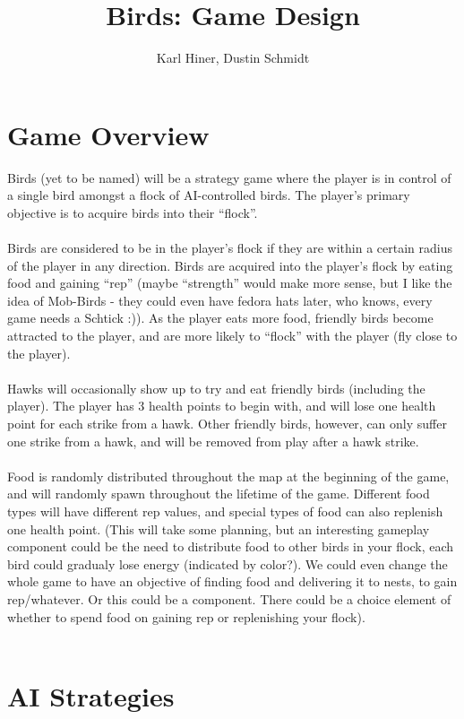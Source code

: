 \documentclass{article}
\begin{document}
\title{Birds: Game Design}
\author{Karl Hiner, Dustin Schmidt}
\maketitle

\section*{Game Overview}
Birds (yet to be named) will be a strategy game where the player is in control of a single bird amongst a flock of AI-controlled birds.  The player's primary objective is to acquire birds into their ``flock''.
\\\\
Birds are considered to be in the player's flock if they are within a certain radius of the player in any direction.  Birds are acquired into the player's flock by eating food and gaining ``rep'' (maybe ``strength'' would make more sense, but I like the idea of Mob-Birds - they could even have fedora hats later, who knows, every game needs a Schtick :)).  As the player eats more food, friendly birds become attracted to the player, and are more likely to ``flock'' with the player (fly close to the player).
\\\\
Hawks will occasionally show up to try and eat friendly birds (including the player).  The player has 3 health points to begin with, and will lose one health point for each strike from a hawk.  Other friendly birds, however, can only suffer one strike from a hawk, and will be removed from play after a hawk strike.
\\\\
Food is randomly distributed throughout the map at the beginning of the game, and will randomly spawn throughout the lifetime of the game.  Different food types will have different rep values, and special types of food can also replenish one health point. (This will take some planning, but an interesting gameplay component could be the need to distribute food to other birds in your flock, each bird could gradualy lose energy (indicated by color?).  We could even change the whole game to have an objective of finding food and delivering it to nests, to gain rep/whatever.  Or this could be a component.  There could be a choice element of whether to spend food on gaining rep or replenishing your flock).
\\\\

\section*{AI Strategies}
\end{document}
